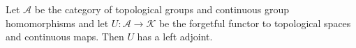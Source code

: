 Let $\mathcal{A}$ be the category of topological groups and continuous group homomorphisms and let $U: \mathcal{A} \longrightarrow \mathcal{K}$ be the forgetful functor to topological spaces and continuous maps. Then $U$ has a left adjoint.
